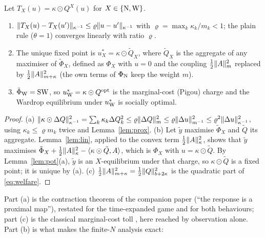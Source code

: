 \begin{proposition}\label{prop:arp}
Let $T_X(u)=\kappa\odot Q^X(u)$ for $X\in\{\mathrm{N},\mathrm{W}\}$.
\begin{enumerate}
\item[(a)] $\lVert T_X(u)-T_X(u')\rVert_{\kappa^{-1}}\le\varrho\lVert u-u'\rVert_{\kappa^{-1}}$ with $\varrho=\max_k\kappa_k/m_k<1$; the plain rule ($\theta=1$) converges linearly with ratio $\varrho$.
\item[(b)] The unique fixed point is $u_X^*=\kappa\odot\tilde Q_X$, where $\tilde Q_X$ is the aggregate of any maximiser of $\tilde\Phi_X$, defined as $\Phi_X$ with $u=0$ and the coupling $\tfrac12\lVert A\rVert_m^2$ replaced by $\tfrac12\lVert A\rVert_{m+\kappa}^2$ (the own terms of $\Phi_{\mathrm{N}}$ keep the weight $m$).
\item[(c)] $\tilde\Phi_{\mathrm{W}}=\mathrm{SW}$, so $u_{\mathrm{W}}^*=\kappa\odot Q^{\mathrm{opt}}$ is the marginal-cost (Pigou) charge and the Wardrop equilibrium under $u_{\mathrm{W}}^*$ is socially optimal.
\end{enumerate}
\end{proposition}
\begin{proof}
(a) $\lVert \kappa\odot\Delta Q\rVert_{\kappa^{-1}}^2=\sum_k\kappa_k\Delta Q_k^2\le\varrho\lVert \Delta Q\rVert_m^2\le\varrho\lVert \Delta u\rVert_{m^{-1}}^2\le\varrho^2\lVert \Delta u\rVert_{\kappa^{-1}}^2$, using $\kappa_k\le\varrho m_k$ twice and Lemma~\ref{lem:prox}. (b) Let $\tilde y$ maximise $\tilde\Phi_X$ and $\tilde Q$ its aggregate. Lemma~\ref{lem:lin}, applied to the convex term $\tfrac12\lVert A\rVert_\kappa^2$, shows that $\tilde y$ maximises $\tilde\Phi_X+\tfrac12\lVert A\rVert_\kappa^2-\langle \kappa\odot\tilde Q,A\rangle$, which is $\Phi_X$ with $u=\kappa\odot\tilde Q$. By Lemma~\ref{lem:pot}(a), $\tilde y$ is an $X$-equilibrium under that charge, so $\kappa\odot\tilde Q$ is a fixed point; it is unique by (a). (c) $\tfrac12\lVert A\rVert_{m+\kappa}^2=\tfrac12\lVert Q\rVert_{b+2\kappa}^2$ is the quadratic part of \eqref{eq:welfare}.
\end{proof}

Part (a) is the contraction theorem of the companion paper (``the response is a proximal map''), restated for the time-expanded game and for both behaviours; part (c) is the classical marginal-cost toll \citep{Beckmann1956}, here reached by observation alone. Part (b) is what makes the finite-$N$ analysis exact:

